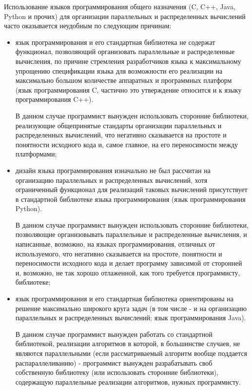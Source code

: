 


Использование языков программирования общего назначения (C, C++, Java, Python и прочих) для организации параллельных и распределенных вычислений часто оказывается неудобным по следующим причинам:

\begin{itemize}

	\item язык программирования и его стандартная библиотека не содержат функционал, позволяющий организовать параллельные и распределенные вычисления, по причине стремления разработчиков языка к максимальному упрощению спецификации языка для возможности его реализации на максимально большом количестве аппаратных и программных платформ (язык программирования C, частично это утверждение относится и к языку программирования C++).

	В данном случае программист вынужден использовать сторонние библиотеки, реализующие общепринятые стандарты организации параллельных и распределенных вычислений, что негативно сказывается на простоте и понятности исходного кода и, самое главное, на его переносимости между платформами;

	\item дизайн языка программирования изначально не был рассчитан на организацию параллельных и распределенных вычислений, хотя ограниченный функционал для реализаций таковых вычислений присутствует в стандартной библиотеке языка программирования (язык программирования Python).

	В данном случае программист вынужден использовать сторонние библиотеки, позволяющие организовывать параллельные и распределенные вычисления, и написанные, возможно, на языках программирования, отличных от используемого, что негативно сказывается на простоте, понятности и переносимости исходного кода и делает программу зависимой от сторонней и, возможно, не так хорошо отлаженной, как того требуется программисту, библиотеке;

	\item язык программирования и его стандартная библиотека ориентированы на решение максимально широкого круга задач (в том числе - и на организацию параллельных и распределенных вычислений; язык программирования Java).

	В данном случае программист вынужден работать со стандартной библиотекой, реализации алгоритмов в которой, в большинстве случаев, не являются параллельными (если рассматриваемый алгоритм вообще поддается распараллеливанию) - программист вынужден разрабатывать своб собственную библиотеку (или использовать сторонние библиотеки), содержащую параллельные реализации алгоритмов, нужных программисту.


\end{itemize}

